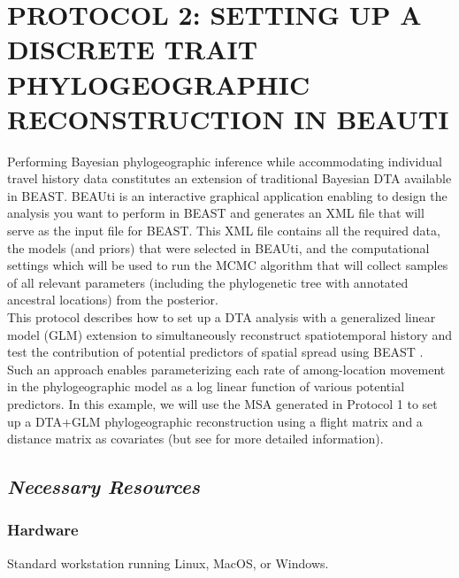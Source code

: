 \documentclass{article}
\begin{document}
\section*{PROTOCOL 2: SETTING UP A DISCRETE TRAIT PHYLOGEOGRAPHIC RECONSTRUCTION IN BEAUTI}

Performing Bayesian phylogeographic inference while accommodating individual travel history data constitutes an extension of traditional Bayesian DTA \cite{dta} available in BEAST. %
BEAUti is an interactive graphical application enabling to design the analysis you want to perform in BEAST and generates an XML file that will serve as the input file for BEAST.
This XML file contains all the required data, the models (and priors) that were selected in BEAUti, and the computational settings which will be used to run the MCMC algorithm that will collect samples of all relevant parameters (including the phylogenetic tree with annotated ancestral locations) from the posterior. \\ 

This protocol describes how to set up a DTA analysis with a generalized linear model (GLM) extension to simultaneously reconstruct spatiotemporal history and test the contribution of potential predictors of spatial spread using BEAST \cite{glm}. %
Such an approach enables parameterizing each rate of among-location movement in the phylogeographic model as a log linear function of various potential predictors.
In this example, we will use the MSA generated in Protocol 1 to set up a DTA+GLM phylogeographic reconstruction using a flight matrix and a distance matrix as covariates (but see \cite{travhist} for more detailed information). %


\subsection*{\textbf{\textit{Necessary Resources}}}
\subsubsection*{Hardware}
\hspace{0.5cm}Standard workstation running Linux, MacOS, or Windows. 
\end{document}

